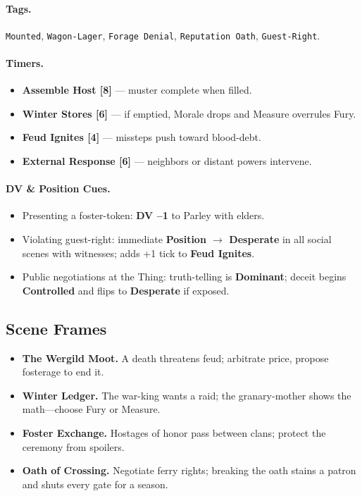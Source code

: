 \documentclass[11pt,letterpaper]{article}
\begin{document}
\paragraph{Tags.} \texttt{Mounted}, \texttt{Wagon-Lager}, \texttt{Forage Denial}, \texttt{Reputation Oath}, \texttt{Guest-Right}.

\paragraph{Timers.}
\begin{itemize}
  \item \textbf{Assemble Host [8]} --- muster complete when filled.
  \item \textbf{Winter Stores [6]} --- if emptied, Morale drops and Measure overrules Fury.
  \item \textbf{Feud Ignites [4]} --- missteps push toward blood-debt.
  \item \textbf{External Response [6]} --- neighbors or distant powers intervene.
\end{itemize}

\paragraph{DV \& Position Cues.}
\begin{itemize}
  \item Presenting a foster-token: \textbf{DV --1} to Parley with elders.
  \item Violating guest-right: immediate \textbf{Position $\rightarrow$ Desperate} in all social scenes with witnesses; adds +1 tick to \textbf{Feud Ignites}.
  \item Public negotiations at the Thing: truth-telling is \textbf{Dominant}; deceit begins \textbf{Controlled} and flips to \textbf{Desperate} if exposed.
\end{itemize}

\subsection*{Scene Frames}
\begin{itemize}
  \item \textbf{The Wergild Moot.} A death threatens feud; arbitrate price, propose fosterage to end it.
  \item \textbf{Winter Ledger.} The war-king wants a raid; the granary-mother shows the math---choose Fury or Measure.
  \item \textbf{Foster Exchange.} Hostages of honor pass between clans; protect the ceremony from spoilers.
  \item \textbf{Oath of Crossing.} Negotiate ferry rights; breaking the oath stains a patron and shuts every gate for a season.
\end{itemize}
\end{document}
